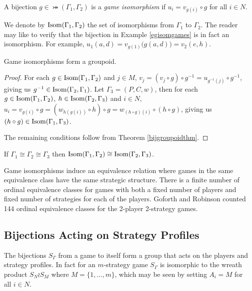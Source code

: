 	\begin{definition}
		A bijection $g \in \bij(\Gamma_1, \Gamma_2)$ is a \textit{game isomorphism} if $u_i = v_{g(i)}\circ g$ for all $i \in N$. 
	\end{definition}

	We denote by $\operatorname*{Isom}(\Gamma_1, \Gamma_2)$ the set of isomorphisms from $\Gamma_1$ to $\Gamma_2$. The reader may like to verify that the bijection in Example \ref{egisomgames} is in fact an isomorphism. For example, $u_1(a, d) = v_{g(1)}\bigl(g(a, d)\bigr) = v_2(e, h)$.
            
	\begin{theorem} 
		Game isomorphisms form a groupoid.
            
		\begin{proof}                
			For each $g \in \operatorname*{Isom}(\Gamma_1, \Gamma_2)$ and $j \in M$, $v_j = (v_j \circ g) \circ g^{-1} = u_{g^{-1}(j)} \circ g^{-1}$, giving us $g^{-1} \in \operatorname*{Isom}(\Gamma_2, \Gamma_1)$. Let $\Gamma_3 = (P, C, w)$, then for each $g \in \operatorname*{Isom}(\Gamma_1, \Gamma_2)$, $h \in \operatorname*{Isom}(\Gamma_2, \Gamma_3)$ and $i \in N$, $u_i = v_{g(i)} \circ g = (w_{h(g(i))} \circ h) \circ g = w_{(h \circ g)(i)} \circ (h \circ g)$, giving us $(h \circ g) \in \operatorname*{Isom}(\Gamma_1, \Gamma_3)$.
                  
			The remaining conditions follow from Theorem \ref{bijgroupoidthm}.
		\end{proof}
	\end{theorem}
        
	\begin{corollary} \label{isocorollary}
		If $\Gamma_1 \cong \Gamma_2 \cong \Gamma_3$ then $\operatorname*{Isom}(\Gamma_1, \Gamma_2) \cong \operatorname*{Isom}(\Gamma_2, \Gamma_3)$.
	\end{corollary}
        
	Game isomorphisms induce an equivalence relation where games in the same equivalence class have the same strategic structure. There is a finite number of ordinal equivalence classes for games with both a fixed number of players and fixed number of strategies for each of the players. Goforth and Robinson \cite{GoforthRobinson} counted 144 ordinal equivalence classes for the 2-player 2-strategy games.
        
\subsection{Bijections Acting on Strategy Profiles}
The bijections $S_{\Gamma}$ from a game to itself form a group that acts on the players and strategy profiles. In fact for an $m$-strategy game $S_{\Gamma}$ is isomorphic to the wreath product $S_N \wr S_M$ where $M = \{1, \ldots, m\}$, which may be seen by setting $A_i = M$ for all $i \in N$. 

